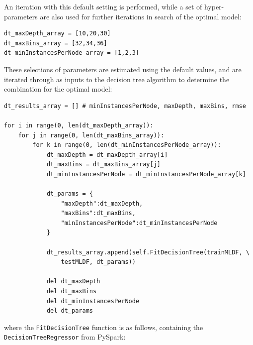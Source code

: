 \documentclass[11pt,a4paper,titlepage]{article}
\begin{document}
An iteration with this default setting is performed, while a set of hyper-parameters are also used for further iterations in search of the optimal model:

\begin{verbatim}
dt_maxDepth_array = [10,20,30]
dt_maxBins_array = [32,34,36]
dt_minInstancesPerNode_array = [1,2,3]
\end{verbatim}

These selections of parameters are estimated using the default values, and are iterated through as inputs to the decision tree algorithm to determine the combination for the optimal model:

\begin{verbatim}
dt_results_array = [] # minInstancesPerNode, maxDepth, maxBins, rmse

for i in range(0, len(dt_maxDepth_array)):
    for j in range(0, len(dt_maxBins_array)):
        for k in range(0, len(dt_minInstancesPerNode_array)):
            dt_maxDepth = dt_maxDepth_array[i]
            dt_maxBins = dt_maxBins_array[j]
            dt_minInstancesPerNode = dt_minInstancesPerNode_array[k]

            dt_params = {
                "maxDepth":dt_maxDepth,
                "maxBins":dt_maxBins,
                "minInstancesPerNode":dt_minInstancesPerNode
            }

            dt_results_array.append(self.FitDecisionTree(trainMLDF, \
                testMLDF, dt_params))

            del dt_maxDepth
            del dt_maxBins
            del dt_minInstancesPerNode
            del dt_params
\end{verbatim}

where the \texttt{FitDecisionTree} function is as follows, containing the \texttt{DecisionTreeRegressor} from PySpark:
\end{document}
